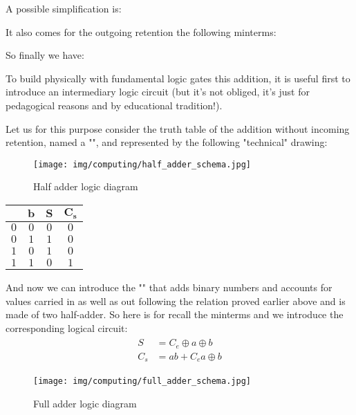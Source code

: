 	A possible simplification is:
	
	It also comes for the outgoing retention the following minterms:
	
	So finally we have:
	
	To build physically with fundamental logic gates this addition, it is useful first to introduce an intermediary logic circuit (but it's not obliged, it's just for pedagogical reasons and by educational tradition!). 
	
	Let us for this purpose consider the truth table of the addition without incoming retention, named a "", and represented by the following "technical" drawing:
	\begin{figure}[H]
		\centering
		\texttt{[image: img/computing/half\_adder\_schema.jpg]}
		\caption{Half adder logic diagram}
	\end{figure}
	\begin{table}[H]
		\centering
		\begin{tabular}{|c|c|c|c|}
		\hline
		\rowcolor[HTML]{9B9B9B} 
		\multicolumn{1}{l|}{\cellcolor[HTML]{9B9B9B}$\pmb{a}$} & \multicolumn{1}{l|}{\cellcolor[HTML]{9B9B9B}$\pmb{b}$} & \multicolumn{1}{l|}{\cellcolor[HTML]{9B9B9B}$\pmb{S}$} & \multicolumn{1}{l|}{\cellcolor[HTML]{9B9B9B}$\pmb{C_s}$} \\ \hline
		$0$ & $0$ & $0$ & $0$  \\ \hline
		$0$ & $1$ & $1$ & $0$  \\ \hline
		$1$ & $0$ & $1$ & $0$  \\ \hline
		$1$ & $1$ & $0$ & $1$  \\ \hline
		\end{tabular}
	\end{table}
	And now we can introduce the "" that adds binary numbers and accounts for values carried in as well as out following the relation proved earlier above and is made of two half-adder. So here is for recall the minterms and we introduce the corresponding logical circuit:
	\begin{gather*}
		\begin{aligned}
		S&=C_e\oplus a\oplus b\\
		C_s&=ab+C_ea\oplus b
		\end{aligned}
	\end{gather*}
	\begin{figure}[H]
		\centering
		\texttt{[image: img/computing/full\_adder\_schema.jpg]}
		\caption{Full adder logic diagram}
	\end{figure}
